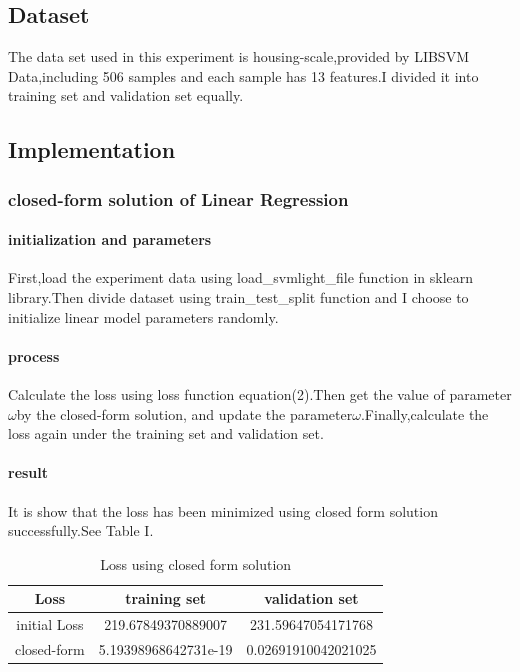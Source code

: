 \documentclass[journal, a4paper]{IEEEtran}
\begin{document}
\subsection{Dataset}
The data set used in this experiment is housing-scale,provided by LIBSVM Data,including 506 samples and each sample has 13 features.I divided it into training set and validation set equally.


\subsection{Implementation}
\subsubsection{closed-form solution of Linear Regression}
\paragraph{initialization and parameters}
First,load the experiment data using load\_svmlight\_file function in sklearn library.Then divide dataset using train\_test\_split function and I choose to initialize linear model parameters randomly. 
\paragraph{process}
Calculate the loss using loss function equation(2).Then get the value of parameter$\omega$by the closed-form solution, and update the parameter$\omega$.Finally,calculate the loss again under the training set and validation set.
\paragraph{result}
It is show that the loss has been minimized using closed form solution successfully.See Table I.
\begin{table}[!hbt]
		\begin{center}
		\caption{Loss using closed form solution}
		\label{tab:simParameters}
		\begin{tabular}{|c|c|c|}
			\hline
			Loss & training set & validation set\\
			\hline
			initial Loss & 219.67849370889007 & 231.59647054171768\\
			\hline
			closed-form &  5.19398968642731e-19 &  0.02691910042021025\\
			\hline
		\end{tabular}
		\end{center}
	\end{table}
\end{document}
